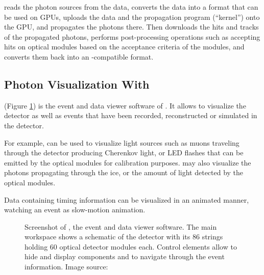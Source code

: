 \clsim reads the photon sources from the \icesim data, converts the data into a format that can be used on GPUs, uploads the data and the propagation program (``kernel'') onto the GPU, and propagates the photons there. Then \clsim downloads the hits and tracks of the propagated photons, performs post-processing operations such as accepting hits on optical modules based on the acceptance criteria of the modules, and converts them back into an \icesim-compatible format.


\subsection{Photon Visualization With \steamshovel}

\steamshovel (Figure \ref{fig:steamshovel}) is the event and data viewer software of \icecube. It allows to visualize the \icecube detector as well as events that have been recorded, reconstructed or simulated in the detector.

For example, \steamshovel can be used to visualize light sources such as muons traveling through the detector producing Cherenkov light, or LED flashes that can be emitted by the optical modules for calibration purposes. \steamshovel may also visualize the photons propagating through the ice, or the amount of light detected by the optical modules.

Data containing timing information can be visualized in an animated manner, watching an event as slow-motion animation.

\begin{figure}
  \caption{Screenshot of \steamshovel, the \icecube event and data viewer software. The main workspace shows a schematic of the \icecube detector with its 86 strings holding 60 optical detector modules each. Control elements allow to hide and display components and to navigate through the event information. Image source: \cite{steamshoveldocumentation}}
  \label{fig:steamshovel}
\end{figure}

